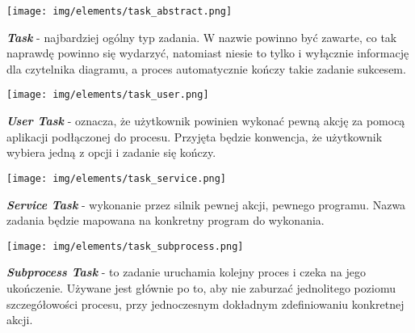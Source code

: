 \documentclass[declaration,shortabstract,mgr]{iithesis}
\begin{document}
\newcommand{\mypointsep}{10pt}

\noindent\begin{minipage}[t]{0.1\textwidth}\vspace{0pt}
\texttt{[image: img/elements/task\_abstract.png]}
\end{minipage}\hfill
\begin{minipage}[t]{0.85\textwidth}\vspace{0pt}
\textbf{\textit{Task}} - najbardziej ogólny typ zadania. W nazwie powinno być zawarte, co tak naprawdę powinno się wydarzyć, natomiast niesie to tylko i wyłącznie informację dla czytelnika diagramu, a proces automatycznie kończy takie zadanie sukcesem.
\end{minipage}

\vspace{\mypointsep}

\noindent\begin{minipage}[t]{0.1\textwidth}\vspace{0pt}
\texttt{[image: img/elements/task\_user.png]}
\end{minipage}\hfill
\begin{minipage}[t]{0.85\textwidth}\vspace{0pt}
\textbf{\textit{User Task}} - oznacza, że użytkownik powinien wykonać pewną akcję za pomocą aplikacji podłączonej do procesu. Przyjęta będzie konwencja, że użytkownik wybiera jedną z opcji i zadanie się kończy.
\end{minipage}

\vspace{\mypointsep}

\noindent\begin{minipage}[t]{0.1\textwidth}\vspace{0pt}
\texttt{[image: img/elements/task\_service.png]}
\end{minipage}\hfill
\begin{minipage}[t]{0.85\textwidth}\vspace{0pt}
\textbf{\textit{Service Task}} - wykonanie przez silnik pewnej akcji, pewnego programu. Nazwa zadania będzie mapowana na konkretny program do wykonania.
\end{minipage}

\vspace{\mypointsep}

\noindent\begin{minipage}[t]{0.1\textwidth}\vspace{0pt}
\texttt{[image: img/elements/task\_subprocess.png]}
\end{minipage}\hfill
\begin{minipage}[t]{0.85\textwidth}\vspace{0pt}
\textbf{\textit{Subprocess Task}} - to zadanie uruchamia kolejny proces i czeka na jego ukończenie. Używane jest głównie po to, aby nie zaburzać jednolitego poziomu szczegółowości procesu, przy jednoczesnym dokładnym zdefiniowaniu konkretnej akcji.
\end{minipage}
\end{document}
